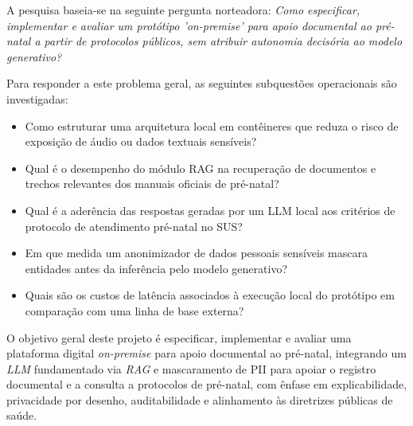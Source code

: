 \documentclass[12pt]{article}
\begin{document}


A pesquisa baseia-se na seguinte pergunta norteadora: \textit{Como especificar, implementar e avaliar um protótipo 'on-premise' para apoio documental ao pré-natal a partir de protocolos públicos, sem atribuir autonomia decisória ao modelo generativo?}

Para responder a este problema geral, as seguintes subquestões operacionais são investigadas:
\begin{itemize}
  \item Como estruturar uma arquitetura local em contêineres que reduza o risco de exposição de áudio ou dados textuais sensíveis?
  \item Qual é o desempenho do módulo RAG na recuperação de documentos e trechos relevantes dos manuais oficiais de pré-natal?
	\item Qual é a aderência das respostas geradas por um LLM local aos critérios de protocolo de atendimento pré-natal no SUS?
	\item Em que medida um anonimizador de dados pessoais sensíveis mascara entidades antes da inferência pelo modelo generativo?
	\item Quais são os custos de latência associados à execução local do protótipo em comparação com uma linha de base externa?
\end{itemize}


O objetivo geral deste projeto é especificar, implementar e avaliar uma plataforma digital \textit{on-premise} para apoio documental ao pré-natal, integrando um \textit{LLM} fundamentado via \textit{RAG} e mascaramento de PII para apoiar o registro documental e a consulta a protocolos de pré-natal, com ênfase em explicabilidade, privacidade por desenho, auditabilidade e alinhamento às diretrizes públicas de saúde.
\end{document}
